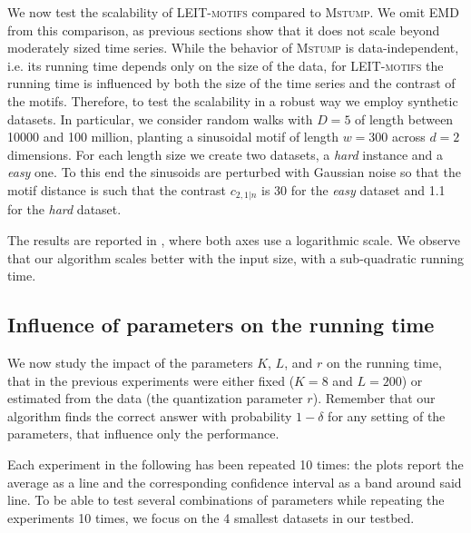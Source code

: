 We now test the scalability of \textsc{LEIT-motifs} compared to \textsc{Mstump}. We omit EMD from this comparison, as previous sections show that it does not scale beyond moderately sized time series.
While the behavior of \textsc{Mstump} is data-independent, i.e. its running time depends only on the size of the data,
for \textsc{LEIT-motifs} the running time is influenced by both the size of the time series and the contrast of the motifs.
Therefore, to test the scalability in a robust way we employ synthetic datasets.
In particular, we consider random walks with $D=5$ of length between 10000 and 100 million, planting a sinusoidal motif of length $w=300$ across $d=2$ dimensions.
For each length size we create two datasets, a \emph{hard} instance and a \emph{easy} one.
To this end the sinusoids are perturbed with Gaussian noise so that the motif distance is such that the contrast
$c_{2,1|n}$ is 30 for the \emph{easy} dataset and 1.1 for the \emph{hard} dataset.

The results are reported in , where both axes use a logarithmic scale.
We observe that our algorithm scales better with the input size, with a sub-quadratic running time.

\subsection{Influence of parameters on the running time}
We now study the impact of the parameters $K$, $L$, and $r$ on the running time, that in the previous experiments were either fixed ($K=8$ and $L=200$) or estimated from the data (the quantization parameter $r$).
Remember that our algorithm finds the correct answer with probability $1-\delta$ for any setting of the parameters, that influence only the performance.

Each experiment in the following has been repeated 10 times: the plots report the average as a line and the corresponding confidence interval as a band around said line.
To be able to test several combinations of parameters while repeating the experiments 10 times, we focus on the 4 smallest datasets in our testbed.


